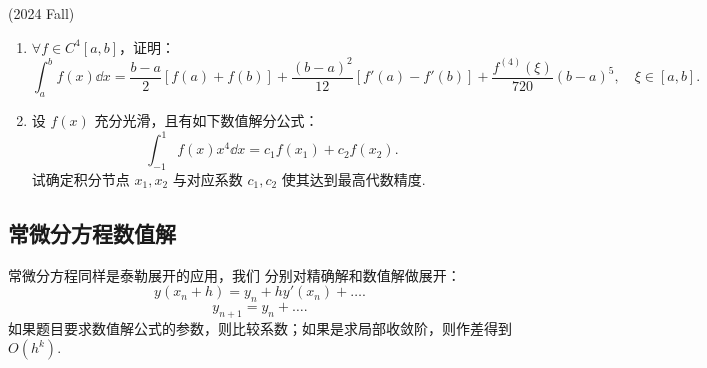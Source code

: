 \begin{problembox}
    \begin{example}
    (2024 Fall) \begin{enumerate}
        \item $\forall f\in C^4[a,b]$，证明：
        \[
            \int_a^b f(x) \dd x = \dfrac{b-a}{2}[f(a)+f(b)]+\dfrac{(b-a)^2}{12}[f'(a)-f'(b)]+\dfrac{f^{(4)}(\xi)}{720}(b-a)^5,\quad \xi \in [a,b].
        \]
        \item 设 $f(x)$ 充分光滑，且有如下数值解分公式：
        \[
            \int_{-1}^{1} f(x)x^4\dd x = c_1f(x_1)+c_2f(x_2).
        \]
        试确定积分节点 $x_1,x_2$ 与对应系数 $c_1,c_2$ 使其达到最高代数精度.
    \end{enumerate}
    \end{example}
    \begin{solution}
        
    \end{solution}
\end{problembox}

\subsection*{常微分方程数值解}
常微分方程同样是泰勒展开的应用，我们{\color{red} 分别对精确解和数值解做展开：
\[
    y(x_n+h) = y_n + hy'(x_n) +\dots.
\]
\[
    y_{n+1} = y_n + \dots.
\]
如果题目要求数值解公式的参数，则比较系数；如果是求局部收敛阶，则作差得到 $O(h^k)$. }

